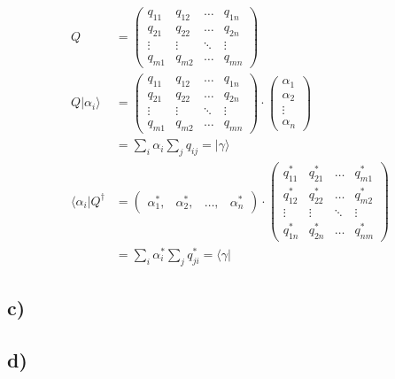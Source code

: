     \begin{align*}
        Q &=
        \begin{pmatrix}
        q_{11} & q_{12} & \ldots & q_{1n}\\
        q_{21} & q_{22} & \ldots & q_{2n}\\
        \vdots & \vdots & \ddots & \vdots\\
        q_{m1} & q_{m2} & \ldots & q_{mn}
        \end{pmatrix}\\
        Q \vert \alpha_i \rangle &=
        \begin{pmatrix}
        q_{11} & q_{12} & \ldots & q_{1n}\\
        q_{21} & q_{22} & \ldots & q_{2n}\\
        \vdots & \vdots & \ddots & \vdots\\
        q_{m1} & q_{m2} & \ldots & q_{mn}
        \end{pmatrix} \cdot 
        \begin{pmatrix}
            \alpha_1\\
            \alpha_2\\
            \vdots\\
            \alpha_n
        \end{pmatrix}\\
        &= \sum_{i} \alpha_i \sum_{j} q_{ij} = \vert \gamma \rangle\\
        \langle \alpha_i \vert Q^{\dagger} &=
        \begin{pmatrix}
            \alpha_1^*, & \alpha_2^*, & \ldots, & \alpha_n^*
        \end{pmatrix} \cdot 
        \begin{pmatrix}
        q_{11}^* & q_{21}^* & \ldots & q_{m1}^*\\
        q_{12}^* & q_{22}^* & \ldots & q_{m2}^*\\
        \vdots & \vdots & \ddots & \vdots\\
        q_{1n}^* & q_{2n}^* & \ldots & q_{nm}^*
        \end{pmatrix}\\
        &= \sum_{i} \alpha_i^* \sum_{j} q_{ji}^* = \langle \gamma \vert
    \end{align*}

\subsection{c)}

\subsection{d)}



